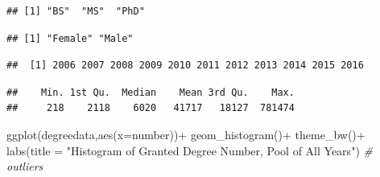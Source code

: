 \documentclass[
  12pt,
]{article}
\newenvironment{Shaded}{\begin{snugshade}}{\end{snugshade}}
\newcommand{\AttributeTok}[1]{\textcolor[rgb]{0.77,0.63,0.00}{#1}}
\newcommand{\CommentTok}[1]{\textcolor[rgb]{0.56,0.35,0.01}{\textit{#1}}}
\newcommand{\FunctionTok}[1]{\textcolor[rgb]{0.00,0.00,0.00}{#1}}
\newcommand{\NormalTok}[1]{#1}
\newcommand{\SpecialCharTok}[1]{\textcolor[rgb]{0.00,0.00,0.00}{#1}}
\newcommand{\StringTok}[1]{\textcolor[rgb]{0.31,0.60,0.02}{#1}}
\begin{document}
\begin{Shaded}
\end{Shaded}

\begin{verbatim}
## [1] "BS"  "MS"  "PhD"
\end{verbatim}

\begin{Shaded}
\end{Shaded}

\begin{verbatim}
## [1] "Female" "Male"
\end{verbatim}

\begin{Shaded}
\end{Shaded}

\begin{verbatim}
##  [1] 2006 2007 2008 2009 2010 2011 2012 2013 2014 2015 2016
\end{verbatim}

\begin{Shaded}
\end{Shaded}

\begin{verbatim}
##    Min. 1st Qu.  Median    Mean 3rd Qu.    Max. 
##     218    2118    6020   41717   18127  781474
\end{verbatim}

\begin{Shaded}
\begin{Highlighting}[]
\FunctionTok{ggplot}\NormalTok{(degreedata,}\FunctionTok{aes}\NormalTok{(}\AttributeTok{x=}\NormalTok{number))}\SpecialCharTok{+}
  \FunctionTok{geom\_histogram}\NormalTok{()}\SpecialCharTok{+}
  \FunctionTok{theme\_bw}\NormalTok{()}\SpecialCharTok{+}
  \FunctionTok{labs}\NormalTok{(}\AttributeTok{title =} \StringTok{"Histogram of Granted Degree Number, Pool of All Years"}\NormalTok{) }\CommentTok{\# outliers}
\end{Highlighting}
\end{Shaded}
\end{document}
